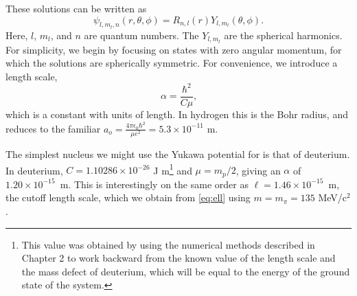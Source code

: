 \documentclass[12pt,twoside]{reedthesis}
\newcommand{\eqn}[1]{\begin{equation}#1\end{equation}}
\begin{document}
These solutions can be written as \cite{griffiths_introduction_2005}
\eqn{
\psi_{l, m_l, n} (r, \theta, \phi) = R_{n,l}(r) Y_{l,m_l}(\theta,\phi)\mbox{.}
}
Here, $l$, $m_l$, and $n$ are quantum numbers. The $Y_{l, m_l}$ are the spherical harmonics. For simplicity, we begin by focusing on states with zero angular momentum, for which the solutions are spherically symmetric.
For convenience, we introduce a length scale, 
\eqn{
\alpha = \frac{\hbar^2}{C \mu}\mbox{,}
\label{eq:bohrradius}
}
which is a constant with units of length. 
In hydrogen this is the Bohr radius, and reduces to the familiar $a_o = \frac{4\pi \epsilon_0 \hbar^2}{\mu e^2} = 5.3 \times 10^{-11}$ m. 

The simplest nucleus we might use the Yukawa potential for is that of deuterium. In deuterium, $C =  1.10286 \times 10^{-26}$ J m\footnote{This value was obtained by using the numerical methods described in Chapter 2 to work backward from the known value of the length scale and the mass defect of deuterium, which will be equal to the energy of the ground state of the system.} and $\mu = m_p/2$, giving an $\alpha$ of $1.20 \times 10^{-15}$~m. This is interestingly on the same order as $\ell = 1.46 \times 10^{-15}$~m, the cutoff length scale, which we obtain from \eqref{eq:ell} using $m = m_{\pi} = 135$ MeV/c$^2$.
\end{document}
